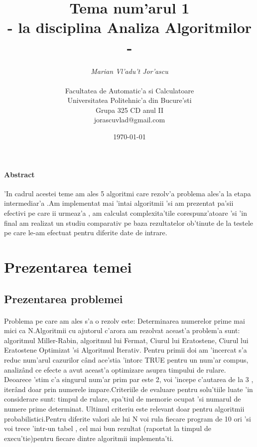 \documentclass[12pt,twoside]{article}
\numberwithin{figure}{section}
\begin{document}
%
%
\title{Tema num'arul 1\\
{\small - la disciplina Analiza Algoritmilor - }}
\author{{\em Marian Vl'adu't Jor'ascu} \\
  \\
 Facultatea de Automatic'a si Calculatoare \\
 Universitatea Politehnic'a din Bucure'sti \\
 Grupa 325 CD anul II\\
 jorascuvlad@gmail.com 
 }
\date{\today}  %


\maketitle

\paragraph{Abstract}
'In cadrul acestei teme am ales 5 algoritmi care rezolv'a problema ales'a la etapa intermediar'a .Am implementat mai 'intai algoritmii 'si am prezentat   pa'sii efectivi pe care ii urmeaz'a  , am calculat complexita'tile corespunz'atoare 'si 'in final am realizat un studiu comparativ pe baza rezultatelor ob'tinute de la testele pe care le-am efectuat pentru diferite date de intrare.
\newpage
\tableofcontents


\newpage
\section{Prezentarea temei}
\subsection{Prezentarea problemei}
\paragraph{}
Problema pe care am ales s'a o rezolv este: Determinarea numerelor prime mai mici ca N.Algoritmii cu ajutorul c'arora am rezolvat aceast'a problem'a sunt: algoritmul Miller-Rabin, algoritmul lui Fermat, Ciurul lui Eratostene, Ciurul lui Eratostene Optimizat 'si Algoritmul Iterativ. Pentru primii doi am 'incercat s'a reduc num'arul cazurilor c\^and ace'stia 'intorc TRUE pentru un num'ar compus, analiz\^and ce efecte a avut aceast'a optimizare asupra timpului de rulare. Deoarece 'stim c'a singurul num'ar prim par este 2, voi 'incepe c'autarea de la 3 , iter\^and doar prin numerele impare.Criteriile de evaluare pentru solu'tiile luate 'in considerare sunt: timpul de rulare, spa'tiul de memorie ocupat 'si numarul de numere prime determinat. Ultimul criteriu este relevant doar pentru algoritmii probabilistici.Pentru diferite valori ale lui N voi rula fiecare program de 10 ori 'si voi trece 'intr-un tabel , cel mai bun rezultat (raportat la timpul de execu'tie)pentru fiecare dintre algoritmii implementa'ti.
\end{document}
